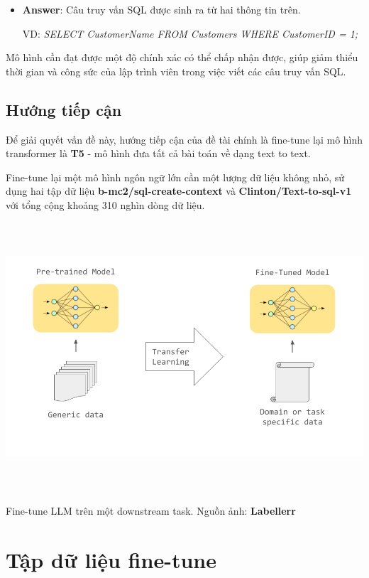 \documentclass[a4paper, 10pt]{article}
\begin{document}
\begin{itemize}
    \item \textbf{Answer}: Câu truy vấn SQL được sinh ra từ hai thông tin trên.
    
    VD: \textit{SELECT CustomerName FROM Customers WHERE CustomerID = 1;}
\end{itemize}

Mô hình cần đạt được một độ chính xác có thể chấp nhận được,
giúp giảm thiểu thời gian và công sức của lập trình viên trong việc viết các câu truy vấn SQL.

\subsection{Hướng tiếp cận}
Để giải quyết vấn đề này, hướng tiếp cận của đề tài chính là fine-tune lại mô hình transformer là \textbf{T5} - mô hình đưa tất cả bài toán về dạng text to text.

Fine-tune lại một mô hình ngôn ngữ lớn cần một lượng dữ liệu không nhỏ, sử dụng hai tập dữ liệu 
\textbf{b-mc2/sql-create-context} và \textbf{Clinton/Text-to-sql-v1} với tổng cộng khoảng 310 nghìn dòng dữ liệu.

\begin{minipage}{\linewidth}
    \captionsetup{type=figure}
    \centering
    \includegraphics[width=14cm, height=10cm]{./finetune.png}
    \caption{Fine-tune LLM trên một downstream task. Nguồn ảnh: \textbf{Labellerr}}
\end{minipage}

\section{Tập dữ liệu fine-tune}
\end{document}
